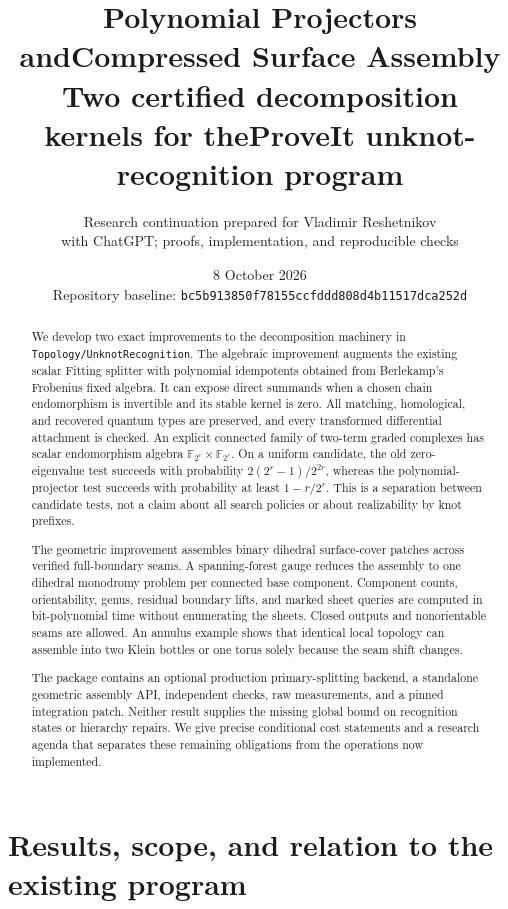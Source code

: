 \documentclass[11pt,a4paper]{article}
\title{\vspace{-12mm}\color{ink}\textbf{Polynomial Projectors and\newline Compressed Surface Assembly}\\[5pt]\large Two certified decomposition kernels for the\newline ProveIt unknot-recognition program}
\author{Research continuation prepared for Vladimir Reshetnikov\\\small with ChatGPT; proofs, implementation, and reproducible checks}
\date{8 October 2026\\\small Repository baseline: \texttt{bc5b913850f78155ccfddd808d4b11517dca252d}}
\theoremstyle{definition}\newtheorem{definition}[theorem]{Definition}
\theoremstyle{remark}\newtheorem{remark}[theorem]{Remark}
\newcommand{\code}[1]{\nolinkurl{#1}}
\begin{document}
\maketitle
\begin{abstract}
We develop two exact improvements to the decomposition machinery in
\code{Topology/UnknotRecognition}. The algebraic improvement augments the
existing scalar Fitting splitter with polynomial idempotents obtained from
Berlekamp's Frobenius fixed algebra. It can expose direct summands when a
chosen chain endomorphism is invertible and its stable kernel is zero. All
matching, homological, and recovered quantum types are preserved, and every
transformed differential attachment is checked. An explicit connected family
of two-term graded complexes has scalar endomorphism algebra
$\mathbb F_{2^r}\times\mathbb F_{2^r}$. On a uniform candidate, the old
zero-eigenvalue test succeeds with probability
$2(2^r-1)/2^{2r}$, whereas the polynomial-projector test succeeds with
probability at least $1-r/2^r$. This is a separation between candidate tests,
not a claim about all search policies or about realizability by knot prefixes.

The geometric improvement assembles binary dihedral surface-cover patches
across verified full-boundary seams. A spanning-forest gauge reduces the
assembly to one dihedral monodromy problem per connected base component.
Component counts, orientability, genus, residual boundary lifts, and marked
sheet queries are computed in bit-polynomial time without enumerating the
sheets. Closed outputs and nonorientable seams are allowed. An annulus example
shows that identical local topology can assemble into two Klein bottles or one
torus solely because the seam shift changes.

The package contains an optional production primary-splitting backend, a
standalone geometric assembly API, independent checks, raw measurements, and a
pinned integration patch. Neither result supplies the missing global bound on
recognition states or hierarchy repairs. We give precise conditional cost
statements and a research agenda that separates these remaining obligations
from the operations now implemented.
\end{abstract}
\clearpage
\tableofcontents
\newpage

\section{Results, scope, and relation to the existing program}
\label{sec:scope}
\end{document}
